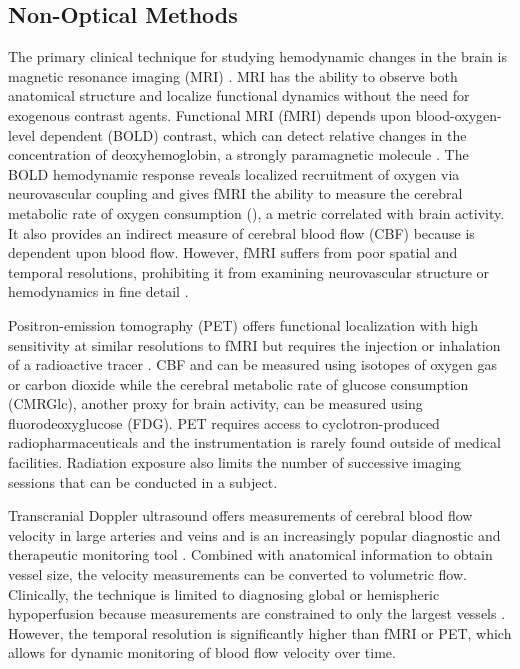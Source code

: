 \subsection{Non-Optical Methods}

The primary clinical technique for studying hemodynamic changes in the brain is magnetic resonance imaging (MRI) \cite{Calamante:2016dg}. MRI has the ability to observe both anatomical structure and localize functional dynamics without the need for exogenous contrast agents. Functional MRI (fMRI) depends upon blood-oxygen-level dependent (BOLD) contrast, which can detect relative changes in the concentration of deoxyhemoglobin, a strongly paramagnetic molecule \cite{Glover:2011eo}. The BOLD hemodynamic response reveals localized recruitment of oxygen via neurovascular coupling and gives fMRI the ability to measure the cerebral metabolic rate of oxygen consumption (), a metric correlated with brain activity. It also provides an indirect measure of cerebral blood flow (CBF) because  is dependent upon blood flow. However, fMRI suffers from poor spatial and temporal resolutions, prohibiting it from examining neurovascular structure or hemodynamics in fine detail \cite{Glover:2011eo}.

Positron-emission tomography (PET) offers functional localization with high sensitivity at similar resolutions to fMRI but requires the injection or inhalation of a radioactive tracer \cite{Wintermark:2005dd}. CBF and  can be measured using isotopes of oxygen gas or carbon dioxide while the cerebral metabolic rate of glucose consumption (CMRGlc), another proxy for brain activity, can be measured using  fluorodeoxyglucose (FDG). PET requires access to cyclotron-produced radiopharmaceuticals and the instrumentation is rarely found outside of medical facilities. Radiation exposure also limits the number of successive imaging sessions that can be conducted in a subject.

Transcranial Doppler ultrasound offers measurements of cerebral blood flow velocity in large arteries and veins and is an increasingly popular diagnostic and therapeutic monitoring tool \cite{Sarkar:2007fk}. Combined with anatomical information to obtain vessel size, the velocity measurements can be converted to volumetric flow. Clinically, the technique is limited to diagnosing global or hemispheric hypoperfusion because measurements are constrained to only the largest vessels \cite{Naqvi:2013hd}. However, the temporal resolution is significantly higher than fMRI or PET, which allows for dynamic monitoring of blood flow velocity over time.

